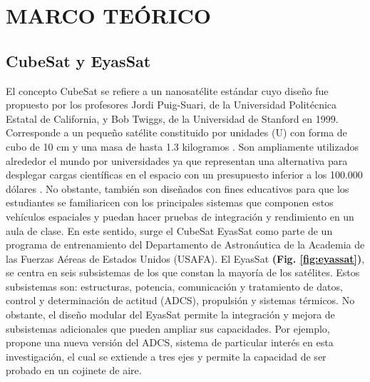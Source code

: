 \newpage
%

\newpage
\section{MARCO TEÓRICO}

\subsection{CubeSat y EyasSat}
El concepto CubeSat se refiere a un nanosatélite estándar cuyo diseño fue propuesto por los profesores Jordi Puig-Suari, de la Universidad Politécnica Estatal de California, y Bob Twiggs, de la Universidad de Stanford en 1999. Corresponde a un pequeño satélite constituido por unidades (U) con forma de cubo de 10 cm y una masa de hasta 1.3 kilogramos \cite{Lan2013}. Son ampliamente utilizados alrededor el mundo por universidades ya que representan una alternativa para desplegar cargas científicas en el espacio con un presupuesto inferior a los 100.000 dólares \cite{opc:Satcatalog}. 
No obstante, también son diseñados con fines educativos para que los estudiantes se familiaricen con los principales sistemas que componen estos vehículos espaciales y puedan hacer pruebas de integración y rendimiento en un aula de clase. En este sentido, surge el CubeSat EyasSat \cite{Barnhart2005} como parte de un programa de entrenamiento del Departamento de Astronáutica de la Academia de las Fuerzas Aéreas de Estados Unidos (USAFA). El EyasSat \textbf{(Fig. \ref{fig:eyassat})}, se centra en seis subsistemas de los que constan la mayoría de los satélites. Estos subsistemas son: estructuras, potencia, comunicación y tratamiento de datos, control y determinación de actitud (ADCS), propulsión y sistemas térmicos. No obstante, el diseño modular del EyasSat permite la integración y mejora de subsistemas adicionales que pueden ampliar sus capacidades. Por ejemplo, \cite{Groenewald2014} propone una nueva versión del ADCS, sistema de particular interés en esta investigación, el cual se extiende a tres ejes y permite la capacidad de ser probado en un cojinete de aire.


